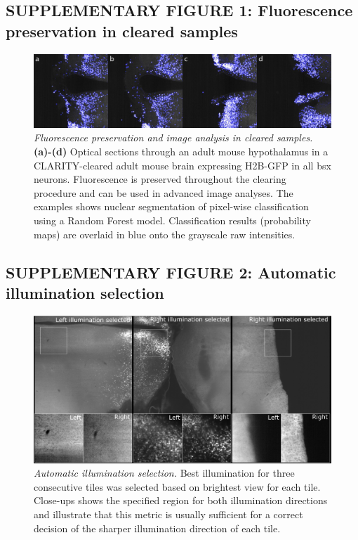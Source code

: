 \documentclass[]{spie}  %
\begin{document}
\subsection*{SUPPLEMENTARY FIGURE 1: Fluorescence preservation in cleared samples}
\vspace{1mm}
\begin{figure}[ht!]
\includegraphics[width=\textwidth]{fig-rf.png}
\vspace{-2.0mm}
\caption{\hspace{-0.5mm} \emph{Fluorescence preservation and image analysis in cleared samples.} \textbf{(a)-(d)} Optical sections through an adult mouse hypothalamus in a CLARITY-cleared adult mouse brain expressing H2B-GFP in all bsx neurons. Fluorescence is preserved throughout the clearing procedure and can be used in advanced image analyses. The examples shows nuclear segmentation of pixel-wise classification using a Random Forest \cite{arganda2017trainable} model. Classification results (probability maps) are overlaid in blue onto the grayscale raw intensities.
}
\label{fig:sup-fig-rf}
\end{figure}

\subsection*{SUPPLEMENTARY FIGURE 2: Automatic illumination selection}
\vspace{1mm}
\begin{figure}[h!]
\includegraphics[width=\textwidth]{Illu_Select.png}
\vspace{-2.0mm}
\caption{\hspace{-0.5mm} \emph{Automatic illumination selection.} Best illumination for three consecutive tiles was selected based on brightest view for each tile. Close-ups shows the specified region for both illumination directions and illustrate that this metric is usually sufficient for a correct decision of the sharper illumination direction of each tile.
}
\label{fig:sup-fig-illu-select}
\end{figure}
\end{document}
